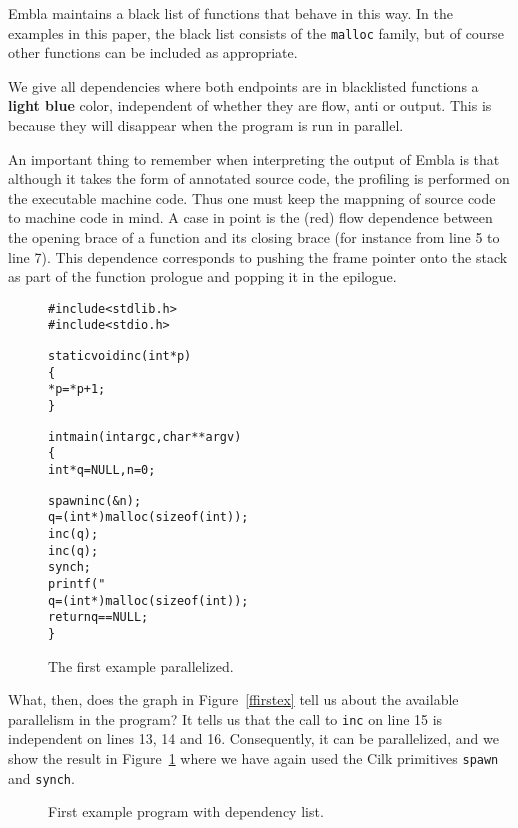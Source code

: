 Embla maintains a black list of functions that behave in this way.
In the examples in this paper, the black list consists of the 
{\tt malloc} family, but of course other functions can be included 
as appropriate. 

We give all dependencies where both endpoints are in blacklisted functions 
a {\bf \color{cyan}light blue} color, independent of whether they are 
flow, anti or output. This is because they will disappear when the
program is run in parallel.

An important thing to remember when interpreting the output of Embla 
is that although it takes the form of annotated source code, the 
profiling is performed on the executable machine code. Thus one must
keep the mappning of source code to machine code in mind. A case in 
point is the (red) flow dependence between the opening brace of a 
function and its closing brace (for instance from line 5 to line 7).
This dependence corresponds to pushing the frame pointer onto the 
stack as part of the function prologue and popping it in the 
epilogue.

\begin{figure}
\small
\hrulefill
\begin{alltt}
#include <stdlib.h>
#include <stdio.h>

static void inc(int *p)
\verb+{+
   *p=*p+1;
\verb+}+

int main(int argc, char **argv)
\verb+{+
   int *q=NULL,n=0;

   {\color{red}spawn} inc(&n);
   q = (int*) malloc( sizeof(int) );
   inc(q);
   inc(q);
   {\color{red}synch;}
   printf( "%d\verb+\+n", *q+n );
   q = (int*) malloc( sizeof(int) );
   return q==NULL;
\verb+}+
\end{alltt}
\hrulefill
\caption{The first example parallelized.}
\label{fparfirstex}
\end{figure}

What, then, does the graph in Figure~\ref{ffirstex} tell us about
the available parallelism in the program? It tells us that 
the call to {\tt inc} on line 15 is independent on lines 13, 14
and 16. Consequently, it can be parallelized, and we show the
result in Figure~\ref{fparfirstex} where we have again used the 
Cilk primitives {\tt spawn} and {\tt synch}.

\begin{figure} 
\small

\caption{First example program with dependency list.}
\label{ffirstexlist}
\end{figure}


